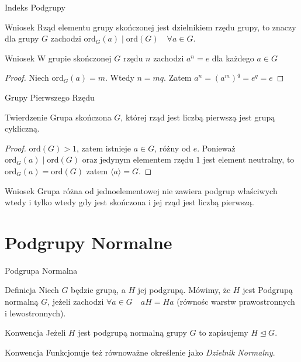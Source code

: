 \documentclass{beamer}
\newcommand{\ord}{\textrm{ord}}
\begin{document}
\begin{frame}{Indeks Podgrupy}
    \begin{alertblock}{Wniosek}
        Rząd elementu grupy skończonej jest dzielnikiem rzędu grupy, to znaczy dla grupy $G$ zachodzi
        $\ord_G(a) \mid  \ord(G) \quad \forall a \in G$. 
    \end{alertblock}
    \begin{alertblock}{Wniosek}
        W grupie skończonej $G$ rzędu $n$ zachodzi $a^n = e$ dla każdego $a \in G$
    \end{alertblock}
    \begin{proof}
        Niech $\ord_G(a) = m$. Wtedy $n = mq$. Zatem $a^n = (a^m)^q = e^q = e$
    \end{proof}
\end{frame}

\begin{frame}{Grupy Pierwszego Rzędu}
    \begin{block}{Twierdzenie}
        Grupa skończona $G$, której rząd jest liczbą pierwszą jest grupą cykliczną.
    \end{block}
    \pause 
    \begin{proof}
        $\ord(G) > 1$, zatem istnieje $a \in G$, różny od $e$. Ponieważ $\ord_G(a) \mid  \ord(G)$ oraz 
        jedynym elementem rzędu $1$ jest element neutralny, to $\ord_G(a) = \ord(G)$ zatem $\langle a \rangle = G$.
    \end{proof}
    \pause 
    \begin{alertblock}{Wniosek}
        Grupa różna od jednoelementowej nie zawiera podgrup właściwych wtedy i tylko wtedy gdy jest skończona i jej rząd jest liczbą pierwszą.        
    \end{alertblock}  
\end{frame}
    
\section{Podgrupy Normalne}

\begin{frame}{Podgrupa Normalna}
    \begin{block}{Definicja}
        Niech $G$ będzie grupą, a $H$ jej podgrupą. Mówimy, że $H$ jest \alert{Podgrupą normalną} $G$,
        jeżeli zachodzi $\forall a \in G \quad aH = Ha$ (równośc warstw prawostronnych i lewostronnych).
    \end{block}
    \begin{alertblock}{Konwencja}
        Jeżeli $H$ jest podgrupą normalną grupy $G$ to zapisujemy $H \trianglelefteq G$.        
    \end{alertblock}
    \begin{alertblock}{Konwencja}
        Funkcjonuje też równoważne określenie jako \textit{Dzielnik Normalny}.
    \end{alertblock}
\end{frame}
\end{document}
